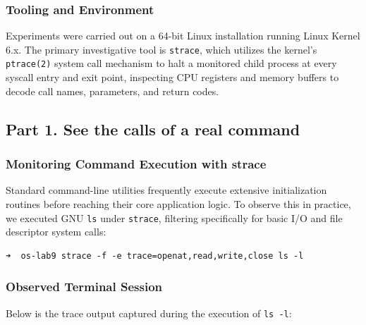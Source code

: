 \documentclass{labreport}
\begin{document}
\subsubsection*{Tooling and Environment}
Experiments were carried out on a 64-bit Linux installation running Linux Kernel 6.x. The primary investigative tool is \texttt{strace}, which utilizes the kernel's \texttt{ptrace(2)} system call mechanism to halt a monitored child process at every syscall entry and exit point, inspecting CPU registers and memory buffers to decode call names, parameters, and return codes.

\subsection{Part 1. See the calls of a real command}

\subsubsection{Monitoring Command Execution with strace}
Standard command-line utilities frequently execute extensive initialization routines before reaching their core application logic. To observe this in practice, we executed GNU \texttt{ls} under \texttt{strace}, filtering specifically for basic I/O and file descriptor system calls:

\begin{lstlisting}[style=bash]
➜  os-lab9 strace -f -e trace=openat,read,write,close ls -l
\end{lstlisting}

\subsubsection{Observed Terminal Session}
Below is the trace output captured during the execution of \texttt{ls -l}:
\end{document}
